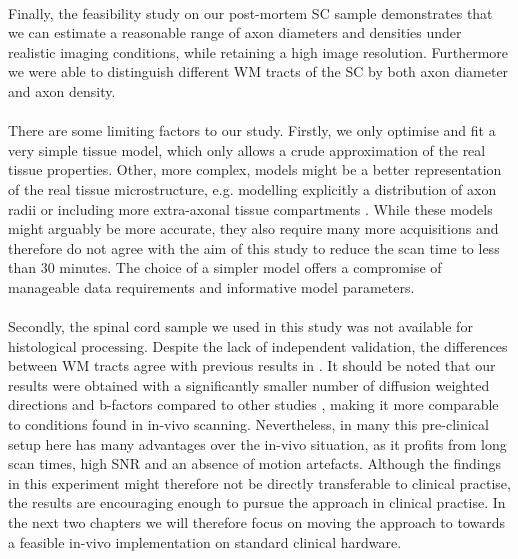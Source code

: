 \paragraph{}
Finally, the feasibility study on our post-mortem SC sample demonstrates that we can estimate a reasonable range of axon diameters and densities under realistic imaging conditions, while retaining a high image resolution. Furthermore we were able to distinguish different WM tracts of the SC by both axon diameter and axon density.
\paragraph{}
There are some limiting factors to our study. Firstly, we only optimise and fit a very simple tissue model, which only allows a crude approximation of the real tissue properties. Other, more complex, models might be a better representation of the real tissue microstructure, e.g. modelling explicitly a distribution of axon radii \citep{Barazany:2009} or including more extra-axonal tissue compartments \citep{Stanisz:1997,Wang:2011,Panagiotaki:2012}.  While these models might arguably be more accurate, they also require many more acquisitions and therefore do not agree with the aim of this study to reduce the scan time to less than 30 minutes. The choice of a simpler model offers a compromise of manageable data requirements and informative model parameters.
\paragraph{}
Secondly, the spinal cord sample we used in this study was not available for histological processing. Despite the lack of independent validation, the differences between WM tracts agree with previous results in \citep{Golabchi:2010}. It should be noted that our results were obtained with a significantly smaller number of diffusion weighted directions and b-factors compared to other studies \citep{Assaf:2008,Barazany:2009,Panagiotaki:2012}, making it more comparable to conditions found in in-vivo scanning. Nevertheless, in many this pre-clinical setup here has many advantages over the in-vivo situation, as it profits from long scan times, high SNR and an absence of motion artefacts. Although the findings in this experiment might therefore not be directly transferable to clinical practise, the results are encouraging enough to pursue the \SF{} approach in clinical practise. In the next two chapters we will therefore focus on moving the \SF{} approach to towards a feasible in-vivo implementation on standard clinical hardware.




